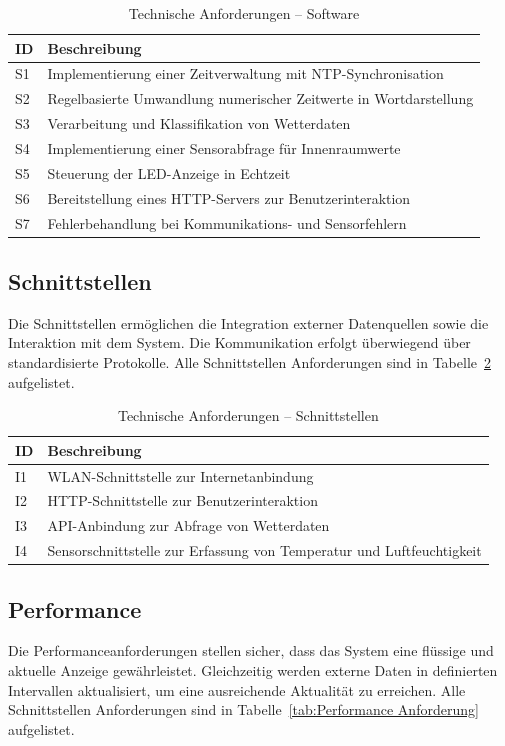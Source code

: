 \begin{table}[H]
\centering
\begin{tabular}{p{3cm} p{9cm}}
\textbf{ID} & \textbf{Beschreibung} \\
\hline
S1 & Implementierung einer Zeitverwaltung mit NTP-Synchronisation \\
S2 & Regelbasierte Umwandlung numerischer Zeitwerte in Wortdarstellung \\
S3 & Verarbeitung und Klassifikation von Wetterdaten \\
S4 & Implementierung einer Sensorabfrage für Innenraumwerte \\
S5 & Steuerung der LED-Anzeige in Echtzeit \\
S6 & Bereitstellung eines HTTP-Servers zur Benutzerinteraktion \\
S7 & Fehlerbehandlung bei Kommunikations- und Sensorfehlern \\
\end{tabular}
\caption{Technische Anforderungen – Software}
\label{tab:Software Anforderung}
\end{table}

\subsection{Schnittstellen}
Die Schnittstellen ermöglichen die Integration externer Datenquellen sowie die Interaktion mit dem System.
Die Kommunikation erfolgt überwiegend über standardisierte Protokolle.
Alle Schnittstellen Anforderungen sind in Tabelle~\ref{tab:Schnittstellen Anforderung} aufgelistet.

\begin{table}[H]
\centering
\begin{tabular}{p{3cm} p{9cm}}
\textbf{ID} & \textbf{Beschreibung} \\
\hline
I1 & WLAN-Schnittstelle zur Internetanbindung \\
I2 & HTTP-Schnittstelle zur Benutzerinteraktion \\
I3 & API-Anbindung zur Abfrage von Wetterdaten \\
I4 & Sensorschnittstelle zur Erfassung von Temperatur und Luftfeuchtigkeit \\
\end{tabular}
\caption{Technische Anforderungen – Schnittstellen}
\label{tab:Schnittstellen Anforderung}
\end{table}

\subsection{Performance}
Die Performanceanforderungen stellen sicher, dass das System eine flüssige und aktuelle Anzeige gewährleistet.
Gleichzeitig werden externe Daten in definierten Intervallen aktualisiert, um eine ausreichende Aktualität zu erreichen.
Alle Schnittstellen Anforderungen sind in Tabelle~\ref{tab:Performance Anforderung} aufgelistet.

